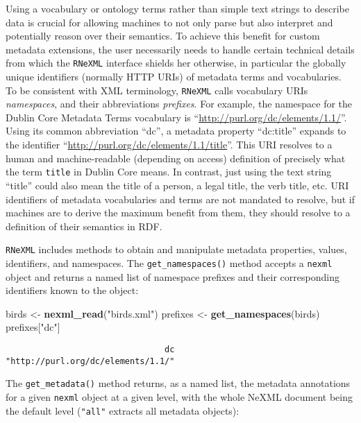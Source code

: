 \documentclass[author-year, review, 11pt]{elsarticle} %
\newenvironment{Shaded}{\begin{snugshade}}{\end{snugshade}}
\newcommand{\KeywordTok}[1]{\textcolor[rgb]{0.13,0.29,0.53}{\textbf{{#1}}}}
\newcommand{\StringTok}[1]{\textcolor[rgb]{0.31,0.60,0.02}{{#1}}}
\newcommand{\NormalTok}[1]{{#1}}
\begin{document}
Using a vocabulary or ontology terms rather than simple text strings to
describe data is crucial for allowing machines to not only parse but
also interpret and potentially reason over their semantics. To achieve
this benefit for custom metadata extensions, the user necessarily needs
to handle certain technical details from which the \texttt{RNeXML}
interface shields her otherwise, in particular the globally unique
identifiers (normally HTTP URIs) of metadata terms and vocabularies. To
be consistent with XML terminology, \texttt{RNeXML} calls vocabulary
URIs \emph{namespaces}, and their abbreviations \emph{prefixes}. For
example, the namespace for the Dublin Core Metadata Terms vocabulary is
``\url{http://purl.org/dc/elements/1.1/}''. Using its common
abbreviation ``dc'', a metadata property ``dc:title'' expands to the
identifier ``\url{http://purl.org/dc/elements/1.1/title}''. This URI
resolves to a human and machine-readable (depending on access)
definition of precisely what the term \texttt{title} in Dublin Core
means. In contrast, just using the text string ``title'' could also mean
the title of a person, a legal title, the verb title, etc. URI
identifiers of metadata vocabularies and terms are not mandated to
resolve, but if machines are to derive the maximum benefit from them,
they should resolve to a definition of their semantics in RDF.

\texttt{RNeXML} includes methods to obtain and manipulate metadata
properties, values, identifiers, and namespaces. The
\texttt{get\_namespaces()} method accepts a \texttt{nexml} object and
returns a named list of namespace prefixes and their corresponding
identifiers known to the object:

\begin{Shaded}
\begin{Highlighting}[]
\NormalTok{birds <-}\StringTok{ }\KeywordTok{nexml_read}\NormalTok{(}\StringTok{"birds.xml"}\NormalTok{)}
\NormalTok{prefixes <-}\StringTok{ }\KeywordTok{get_namespaces}\NormalTok{(birds)}
\NormalTok{prefixes[}\StringTok{"dc"}\NormalTok{]}
\end{Highlighting}
\end{Shaded}

\begin{verbatim}
                                dc 
"http://purl.org/dc/elements/1.1/" 
\end{verbatim}

The \texttt{get\_metadata()} method returns, as a named list, the
metadata annotations for a given \texttt{nexml} object at a given level,
with the whole NeXML document being the default level (\texttt{"all"}
extracts all metadata objects):
\end{document}
